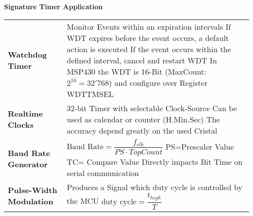 \textbf{Signature Timer Application }\newline
\begin{tabular}{p{5cm} p{15cm}}
	\textbf{Watchdog Timer } &
    Monitor Events within an expiration intervals\newline
	 If WDT expires before the event occurs, a default action is executed\newline
	 If the event occurs within the defined interval, cancel and restart WDT\newline
	 In MSP430 the WDT is 16-Bit (MaxCount: $2^{16}=32'768$) \newline
	 and configure over Register WDTTMSEL\\
     
	\textbf{Realtime Clocks} &
    32-bit Timer with selectable Clock-Source\newline
    Can be used as calendar or counter (H.Min.Sec)\newline
    The accuracy depend greatly on the used Cristal\\
    
	\textbf{Baud Rate Generator} &
     $ \text{Baud Rate}=\dfrac{f_{clk}}{PS \cdot TopCount} $\newline
     PS=Prescaler Value \quad TC= Compare Value\newline
     Directly impacts Bit Time on serial communication\\
     
	\textbf{Pulse-Width Modulation} &
    Produces a Signal which duty cycle is controlled by the MCU \newline
    $ \text{duty cycle}=\dfrac{t_{high}}{T} $\\
\end{tabular}


\clearpage
\pagebreak